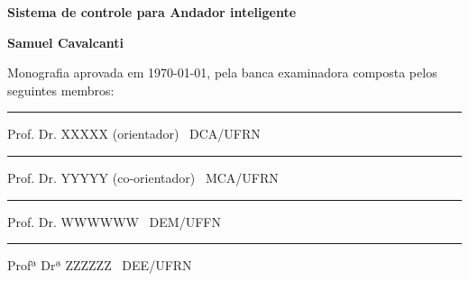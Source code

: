 %
%

\begin{titlepage}

\begin{center}

\LARGE

\textbf{Sistema de controle para Andador inteligente}

\vfill

\Large

\textbf{Samuel Cavalcanti}

\end{center}

\vfill

\noindent
Monografia aprovada em \today, pela banca examinadora composta
pelos seguintes membros:


\begin{center}

\vspace{1.5cm}\rule{0.95\linewidth}{1pt}
\parbox{0.9\linewidth}{%
Prof. Dr. XXXXX (orientador) \dotfill\ DCA/UFRN}

\vspace{1.5cm}\rule{0.95\linewidth}{1pt}
\parbox{0.9\linewidth}{%
Prof. Dr. YYYYY (co-orientador) \dotfill\ MCA/UFRN}

\vspace{1.5cm}\rule{0.95\linewidth}{1pt}
\parbox{0.9\linewidth}{%
Prof. Dr. WWWWWW \dotfill\ DEM/UFFN}

\vspace{1.5cm}\rule{0.95\linewidth}{1pt}
\parbox{0.9\linewidth}{%
Profª Drª ZZZZZZ \dotfill\ DEE/UFRN}

\end{center}

\end{titlepage}

%
%


